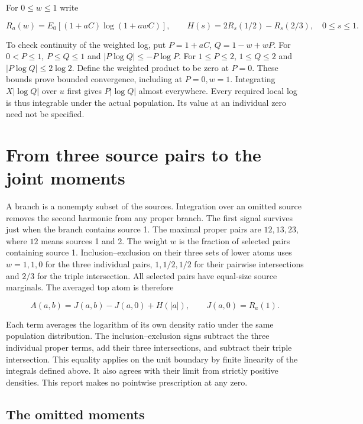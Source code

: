 For \(0\le w\le1\) write

\[
R_a(w)=E_0[(1+aC)\log(1+awC)],\qquad H(s)=2R_s(1/2)-R_s(2/3),\quad 0\le s\le1.
\]

To check continuity of the weighted log, put \(P=1+aC\), \(Q=1-w+wP\). For \(0<P\le1\), \(P\le Q\le1\) and \(|P\log Q|\le -P\log P\). For \(1\le P\le2\), \(1\le Q\le2\) and \(|P\log Q|\le2\log2\). Define the weighted product to be zero at \(P=0\). These bounds prove bounded convergence, including at \(P=0,w=1\). Integrating \(X|\log Q|\) over \(u\) first gives \(P|\log Q|\) almost everywhere. Every required local log is thus integrable under the actual population. Its value at an individual zero need not be specified.

\clearpage

\section{From three source pairs to the joint moments}\label{from-three-source-pairs-to-the-joint-moments}

A branch is a nonempty subset of the sources. Integration over an omitted source removes the second harmonic from any proper branch. The first signal survives just when the branch contains source 1. The maximal proper pairs are \(12,13,23\), where \(12\) means sources 1 and 2. The weight \(w\) is the fraction of selected pairs containing source 1. Inclusion--exclusion on their three sets of lower atoms uses \(w=1,1,0\) for the three individual pairs, \(1,1/2,1/2\) for their pairwise intersections and \(2/3\) for the triple intersection. All selected pairs have equal-size source marginals. The averaged top atom is therefore

\[
A(a,b)=J(a,b)-J(a,0)+H(|a|),\qquad J(a,0)=R_a(1).
\]

Each term averages the logarithm of its own density ratio under the same population distribution. The inclusion--exclusion signs subtract the three individual proper terms, add their three intersections, and subtract their triple intersection. This equality applies on the unit boundary by finite linearity of the integrals defined above. It also agrees with their limit from strictly positive densities. This report makes no pointwise prescription at any zero.

\subsection{The omitted moments}\label{the-omitted-moments}

